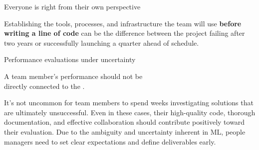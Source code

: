 \begin{frame}{Everyone is right from their own perspective}
  \begin{withmargin}
    \begin{tdmargin}
      Establishing the tools, processes, and infrastructure the team will use
      \textbf{before writing a line of code} can be the difference between the
      project failing after two years or successfully launching a quarter ahead
      of schedule.
    \end{tdmargin}
  \end{withmargin}
\end{frame}

\begin{frame}{Performance evaluations under uncertainty}
  \vfill
  \begin{takeaway}
    A team member's performance should not be\\
    directly connected to the .
  \end{takeaway}
  \vfill
  {\small It's not uncommon for team members to spend weeks investigating
  solutions that are ultimately unsuccessful. Even in these cases, their
  high-quality code, thorough documentation, and effective collaboration should
  contribute positively toward their evaluation. Due to the ambiguity and
  uncertainty inherent in ML, people managers need to set clear expectations and
  define deliverables early.}
\end{frame}

